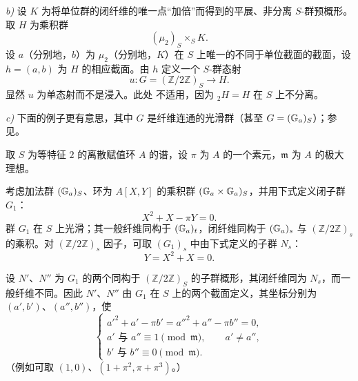 \medskip
\noindent\textit{b)} 设 \(K\) 为将单位群的闭纤维的唯一点“加倍”而得到的平展、非分离 \(S\)-群预概形。取 \(H\) 为乘积群
\[
  (\mu_2)_S\times_S K.
\]
设 \(a\)（分别地，\(b\)）为 \(\mu_2\)（分别地，\(K\)）在 \(S\) 上唯一的不同于单位截面的截面，设 \(h=(a,b)\) 为 \(H\) 的相应截面。由 \(h\) 定义一个 \(S\)-群态射
\[
  u:G=(\mathbb Z/2\mathbb Z)_S\longrightarrow H.
\]
显然 \(u\) 为单态射而不是浸入。此处 不适用，因为 \({}_{2}H=H\) 在 \(S\) 上不分离。

\medskip
\noindent{}\textit{c)} 下面的例子更有意思，其中 \(G\) 是纤维连通的光滑群（甚至 \(G=(\mathbb G_a)_S\)）；参见。

取 \(S\) 为等特征 \(2\) 的离散赋值环 \(A\) 的谱，设 \(\pi\) 为 \(A\) 的一个素元，\(\mathfrak m\) 为 \(A\) 的极大理想。

考虑加法群 \((\mathbb G_a)_S\)、环为 \(A[X,Y]\) 的乘积群 \((\mathbb G_a\times\mathbb G_a)_S\)，并用下式定义闭子群 \(G_1\)：
\begin{equation}
  X^2+X-\pi Y=0.
  \tag{1}\label{sga3:xvi:eq:1}
\end{equation}
群 \(G_1\) 在 \(S\) 上光滑；其一般纤维同构于 \((\mathbb G_a)_t\)，闭纤维同构于 \((\mathbb G_a)_s\) 与 \((\mathbb Z/2\mathbb Z)_s\) 的乘积。对 \((\mathbb Z/2\mathbb Z)_s\) 因子，可取 \((G_1)_s\) 中由下式定义的子群 \(N_s\)：
\begin{equation}
  Y=X^2+X=0.
  \tag{2}\label{sga3:xvi:eq:2}
\end{equation}

设 \(N'\)、\(N''\) 为 \(G_1\) 的两个同构于 \((\mathbb Z/2\mathbb Z)_S\) 的子群概形，其闭纤维同为 \(N_s\)，而一般纤维不同。因此 \(N'\)、\(N''\) 由 \(G_1\) 在 \(S\) 上的两个截面定义，其坐标分别为 \((a',b')\)、\((a'',b'')\)，使
\begin{equation}
  \begin{cases}
    a'^2+a'-\pi b'=a''^2+a''-\pi b''=0,\\
    a'\text{ 与 }a''\equiv 1\pmod{\mathfrak m},
      \qquad a'\ne a'',\\
    b'\text{ 与 }b''\equiv 0\pmod{\mathfrak m}.
  \end{cases}
  \tag{3}\label{sga3:xvi:eq:3}
\end{equation}
（例如可取 \((1,0)\)、\((1+\pi^2,\pi+\pi^3)\)。）

